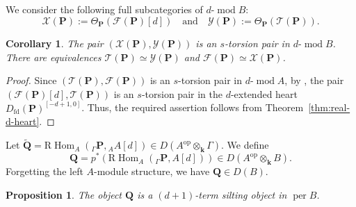 \documentclass[11pt,a4paper,reqno]{amsart}
\theoremstyle{plain}
\newtheorem{corollary}[theorem]{Corollary}
\newtheorem{proposition}[theorem]{Proposition}
\numberwithin{equation}{section}
\theoremstyle{definition}
\providecommand{\per}{\operatorname{per}}
\renewcommand{\mod}{\operatorname{mod}}
\newcommand{\Hom}{\operatorname{Hom}}
\newcommand{\RHom}{\mathrm R\!\Hom}
\renewcommand{\k}{\mathbf{k}}
\newcommand{\emod}[2]{#1\text{-}\!\mod #2}
\newcommand{\eheart}[2]{#2^{[-#1+1,0]}}
\newcommand{\PP}{\mathbf{P}}
\newcommand{\QQ}{\mathbf{Q}}
\newcommand{\T}{\mathcal{T}}
\newcommand{\F}{\mathcal{F}}
\newcommand{\X}{\mathcal{X}}
\newcommand{\Y}{\mathcal{Y}}
\begin{document}
We consider the following full subcategories of $\emod{d}{B}$:
\[\X(\PP):=\Theta_{\PP}(\F(\PP)[d])\quad\text{and}\quad
 \Y(\PP):=\Theta_{\PP}(\T(\PP)).\]

\begin{corollary}\label{cor:higherBB}
The pair $(\X(\PP),\Y(\PP))$ is an $s$-torsion
pair in $\emod{d}{B}$.  There are equivalences $\T(\PP)\simeq\Y(\PP)$ and $\F(\PP)\simeq\X(\PP)$.
\end{corollary}

\begin{proof}
  Since $(\T(\PP),\F(\PP))$ is an $s$-torsion pair in $\emod{d}{A}$,  by \cite[Theorem~1.12]{Z}, the pair $(\F(\PP)[d],\T(\PP))$ is an $s$-torsion pair in the $d$-extended heart $\eheart{d}{D_{\mathrm{fd}}(\PP)}$. Thus, the required assertion follows from Theorem~\ref{thm:real-d-heart}.
\end{proof}

Let $\widetilde{\QQ}=\RHom_A({}_\Gamma\PP,{}_A A[d])\in D(A^{\mathrm{op}}\otimes_{\k}\Gamma)$. We define
\begin{equation}\label{eq:defQ}
  \QQ=p^*\left(\RHom_A({}_\Gamma\PP,A[d])\right)\in D(A^{\mathrm{op}}\otimes_{\k}B).
\end{equation}
Forgetting the left $A$-module structure, we have $\QQ\in D(B)$.

\begin{proposition}\label{prop:Qsilt}
  The object $\QQ$ is a $(d+1)$-term silting object in $\per B$.
\end{proposition}
\end{document}

